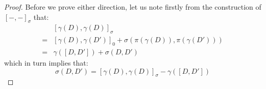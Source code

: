             \begin{proof}
                Before we prove either direction, let us note firstly from the construction of $[-, -]_{\sigma}$ that:
                    $$
                        \begin{aligned}
                            & [\gamma(D), \gamma(D)]_{\sigma}
                            \\
                            = & [\gamma(D), \gamma(D')]_0 + \sigma( \pi(\gamma(D)), \pi(\gamma(D')) )
                            \\
                            = & \gamma([D, D']) + \sigma(D, D')
                        \end{aligned}
                    $$
                which in turn implies that:
                    \begin{equation} \label{equation: 2_cocycle_in_terms_of_section}
                        \sigma(D, D') = [\gamma(D), \gamma(D)]_{\sigma} - \gamma([D, D'])
                    \end{equation}
            

\end{proof}
